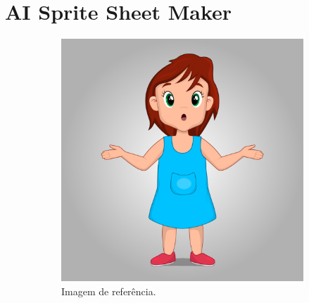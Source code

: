 \FloatBarrier
\section{AI Sprite Sheet Maker}
\label{s.AISpriteSheetMakerApendice}

\begin{figure}[htbp]
    \centering
    \caption{\small Demonstração do resultado esperado pela ferramenta AI Sprite Sheet Maker}
    \label{fig:segmindDemo}
    \begin{subfigure}{0.45\linewidth}
        \centering
        \includegraphics[width=1\linewidth]{figs/segmind/segmind_demo_referencia.jpg}
        \caption{\small Imagem de referência.}
        \label{fig:segmindReferencia}
    \end{subfigure}
        \begin{subfigure}{0.45\linewidth}
        \centering

\end{subfigure}
\end{figure}
